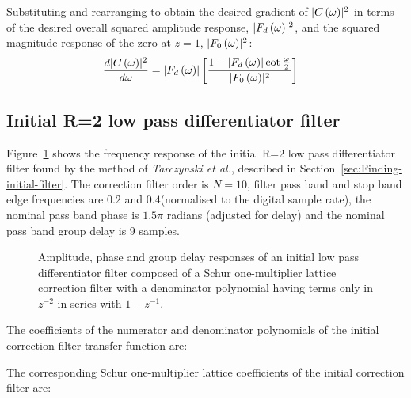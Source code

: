 \documentclass[a4paper,twoside,10pt,english]{article}
\newcommand{\DesignOfSchurLatticeFiltersPdfScale}{1}
\DeclarePairedDelimiter{\mathabs}{\lvert}{\rvert}
\begin{document}
Substituting and rearranging to obtain the desired gradient of
$\mathabs{C\left(\omega\right)}^{2}$ in terms of the desired overall squared
amplitude response, $\mathabs{F_{d}\left(\omega\right)}^{2}$, and the
squared magnitude response of the zero at $z=1$,
$\mathabs{F_{0}\left(\omega\right)}^{2}$:
\begin{align*}
  \frac{d\mathabs{C\left(\omega\right)}^{2}}{d\omega}
  &= \mathabs{F_{d}\left(\omega\right)}
\left[\frac{1-\mathabs{F_{d}\left(\omega\right)}\cot\frac{\omega}{2}}{\mathabs{F_{0}\left(\omega\right)}^{2} }\right]
\end{align*}

\clearpage

\subsection{Initial R=2 low pass differentiator filter}
Figure~\ref{fig:Schur-OneM-lattice-correction-lowpass-differentiator-R2-initial}
shows the frequency response of the initial R=2 low pass differentiator filter
found by the method of \emph{Tarczynski et al.}, described in
Section~\ref{sec:Finding-initial-filter}. The correction filter order is $N=10$,
filter pass band and stop band edge frequencies are $0.2$ and $0.4$\;(normalised
to the digital sample rate), the nominal pass band phase is $1.5\pi$
radians (adjusted for delay) and the nominal pass band group delay is $9$
samples.
\begin{figure}[!hb]
\centering
\scalebox{\DesignOfSchurLatticeFiltersPdfScale}{}
\caption{Amplitude, phase and group delay responses of an initial 
  low pass differentiator filter composed of a Schur one-multiplier lattice
  correction filter with a denominator polynomial having terms only in $z^{-2}$
  in series with $1-z^{-1}$.}
\label{fig:Schur-OneM-lattice-correction-lowpass-differentiator-R2-initial}
\end{figure}

The coefficients of the numerator and denominator polynomials of the initial
correction filter transfer function are:
\begin{small}


\end{small}

The corresponding Schur one-multiplier lattice coefficients of the initial
correction filter are:
\begin{small}



\end{small}
\end{document}

